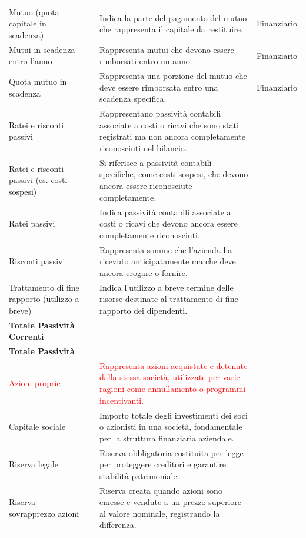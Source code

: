 \documentclass{article}
\newcommand{\MutuoQuotaCapitaleScadenza}{Indica la parte del pagamento del mutuo che rappresenta il capitale da restituire.}
\newcommand{\MutuiScadenzaEntroAnno}{Rappresenta mutui che devono essere rimborsati entro un anno.}
\newcommand{\QuotaMutuoScadenza}{Rappresenta una porzione del mutuo che deve essere rimborsata entro una scadenza specifica.}
\newcommand{\RateiRiscontiPassivi}{Rappresentano passività contabili associate a costi o ricavi che sono stati registrati ma non ancora completamente riconosciuti nel bilancio.}
\newcommand{\RateiRiscontiPassiviCostiSospesi}{Si riferisce a passività contabili specifiche, come costi sospesi, che devono ancora essere riconosciute completamente.}
\newcommand{\RateiPassivi}{Indica passività contabili associate a costi o ricavi che devono ancora essere completamente riconosciuti.}
\newcommand{\RiscontiPassivi}{Rappresenta somme che l'azienda ha ricevuto anticipatamente ma che deve ancora erogare o fornire.}
\newcommand{\TrattamentoFineRapportoUtilizzoBreve}{Indica l'utilizzo a breve termine delle risorse destinate al trattamento di fine rapporto dei dipendenti.}
\newcommand{\AzioniProprie}{Rappresenta azioni acquistate e detenute dalla stessa società, utilizzate per varie ragioni come annullamento o programmi incentivanti.}
\newcommand{\CapitaleSociale}{Importo totale degli investimenti dei soci o azionisti in una società, fondamentale per la struttura finanziaria aziendale.}
\newcommand{\RiservaLegale}{Riserva obbligatoria costituita per legge per proteggere creditori e garantire stabilità patrimoniale.}
\newcommand{\RiservaSovrapprezzoAzioni}{Riserva creata quando azioni sono emesse e vendute a un prezzo superiore al valore nominale, registrando la differenza.}
\begin{document}
\begin{table}[ht]
{\begin{tabular}{|l|c|l|c|}
            Mutuo (quota capitale in scadenza)                   &                    & \MutuoQuotaCapitaleScadenza           & Finanziario     \\
            Mutui in scadenza entro l’anno                       &                    & \MutuiScadenzaEntroAnno               & Finanziario     \\
            Quota mutuo in scadenza                              &                    & \QuotaMutuoScadenza                   & Finanziario     \\
            Ratei e risconti passivi                             &                    & \RateiRiscontiPassivi                 &                 \\
            Ratei e risconti passivi (es. costi sospesi)         &                    & \RateiRiscontiPassiviCostiSospesi     &                 \\
            Ratei passivi                                        &                    & \RateiPassivi                         &                 \\
            Risconti passivi                                     &                    & \RiscontiPassivi                      &                 \\
            Trattamento di fine rapporto (utilizzo a breve)      &                    & \TrattamentoFineRapportoUtilizzoBreve &                 \\
            \hline
            \textbf{Totale Passività Correnti}                   &                    &                                       &                 \\
            \hline
            \multicolumn{4}{|l|}{\textbf{Totale Passività}}                                                                                     \\
            \hline
            \hline
            \textcolor{red}{Azioni proprie}                      & \textcolor{red}{-} & \textcolor{red}{\AzioniProprie}       &                 \\
            Capitale sociale                                     &                    & \CapitaleSociale                      &                 \\
            Riserva legale                                       &                    & \RiservaLegale                        &                 \\
            Riserva sovrapprezzo azioni                          &                    & \RiservaSovrapprezzoAzioni            &                 \\

\end{tabular}}
\end{table}
\end{document}
